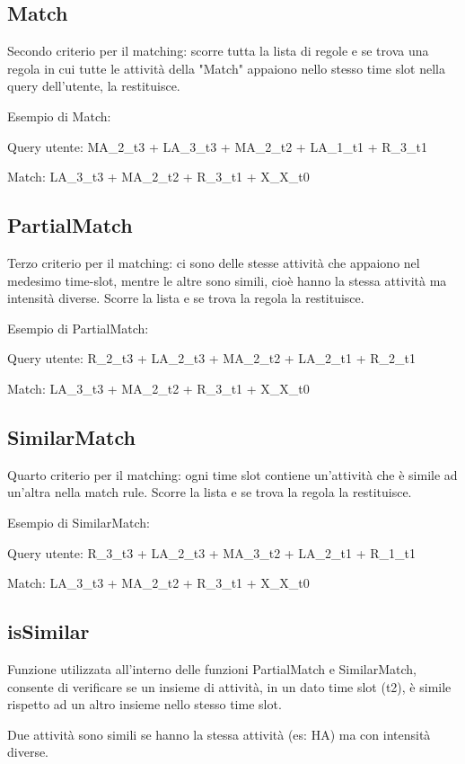 \documentclass{article}
\begin{document}
\subsection{Match}
Secondo criterio per il matching: scorre tutta la lista di regole e se trova una regola in cui tutte le attività della "Match" appaiono nello stesso time slot nella query dell'utente, la restituisce.

Esempio di Match: 

Query utente: MA\_2\_t3 + LA\_3\_t3 + MA\_2\_t2 + LA\_1\_t1 + R\_3\_t1

Match: LA\_3\_t3 + MA\_2\_t2 + R\_3\_t1 + X\_X\_t0 

\subsection{PartialMatch}
Terzo criterio per il matching: ci sono delle stesse attività che appaiono nel medesimo time-slot, mentre le altre sono simili, cioè hanno la stessa attività ma intensità diverse. Scorre la lista e se trova la regola la restituisce.

Esempio di PartialMatch: 

Query utente: R\_2\_t3 + LA\_2\_t3 + MA\_2\_t2 + LA\_2\_t1 + R\_2\_t1

Match: LA\_3\_t3 + MA\_2\_t2 + R\_3\_t1 + X\_X\_t0 

\subsection{SimilarMatch}
Quarto criterio per il matching: ogni time slot contiene un'attività che è simile ad un'altra nella match rule.
Scorre la lista e se trova la regola la restituisce.


Esempio di SimilarMatch: 

Query utente: R\_3\_t3 + LA\_2\_t3 + MA\_3\_t2 + LA\_2\_t1 + R\_1\_t1

Match: LA\_3\_t3 + MA\_2\_t2 + R\_3\_t1 + X\_X\_t0


\subsection{isSimilar}
Funzione utilizzata all'interno delle funzioni PartialMatch e SimilarMatch, consente di verificare se un insieme di attività, in un dato time slot (t2), è simile rispetto ad un altro insieme nello stesso time slot.

Due attività sono simili se hanno la stessa attività (es: HA) ma con intensità diverse.
\end{document}
